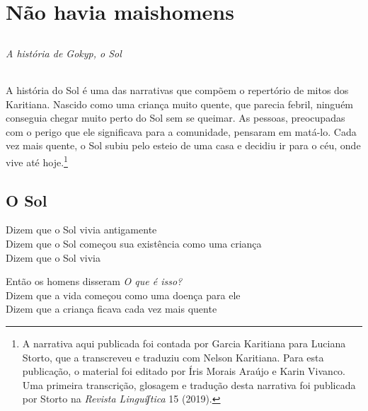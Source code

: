 \part[Não havia mais homens]{Não havia mais\break homens}

\chapter*{}
\thispagestyle{empty}

\vspace*{\fill}
\paragraph{A história de Gokyp, o Sol} A história do Sol é uma das narrativas que compõem o repertório de mitos dos Karitiana. Nascido como uma criança muito quente, que parecia febril, ninguém conseguia chegar muito perto do Sol sem se queimar. As
pessoas, preocupadas com o perigo que ele significava para a comunidade,
pensaram em matá-lo. Cada vez mais quente, o Sol subiu pelo esteio de
uma casa e decidiu ir para o céu, onde vive até hoje.\footnote{A narrativa aqui publicada foi contada por Garcia Karitiana para Luciana Storto, que a transcreveu e traduziu com Nelson Karitiana. Para esta
publicação, o material foi editado por Íris Morais Araújo e Karin
Vivanco. Uma primeira transcrição, glosagem e tradução desta narrativa foi publicada por Storto na \textit{Revista Linguíʃtica} 15 (2019).}
\vspace*{\fill}

\chapter{O Sol}

\begin{linenumbers}
\noindent Dizem que o Sol vivia antigamente\\
Dizem que o Sol começou sua existência como uma criança\\
Dizem que o Sol vivia
\end{linenumbers}

\bigskip

\begin{linenumbers}
\noindent Então os homens disseram \textit{O que é isso?}\\
Dizem que a vida começou como uma doença para ele\\
Dizem que a criança ficava cada vez mais quente
\end{linenumbers}

